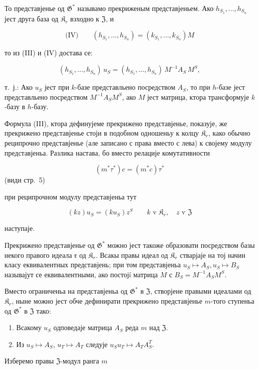 \documentclass[11pt]{article}
\begin{document}
То представјенье од \(\mathfrak{G}^*\) называмо прекриженым представјеньем. Ако \(h_{S_1}, \ldots, h_{S_n}\) јест друга база од \(\mathfrak{K}_r\) взходно к \(\mathfrak{Z}\), и

\[
\text{(IV)}\qquad (h_{S_1}, \ldots, h_{S_n}) = (k_{S_1}, \ldots, k_{S_n})M
\]

то из (III) и (IV) достава се:

\[(h_{S_1},\ldots,h_{S_n})\,u_S=(h_{S_1},\ldots,h_{S_n})\,M^{-1}A_S\,M^S,\]

т.~ј.: Ако \(u_S\) јест при \(k\)-базе представльено посредством \(A_S\), то при \(h\)-базе јест представльено посредством \(M^{-1}A_SM^S\), ако \(M\) јест матрица, ктора трансформује \(k\)-базу в \(h\)-базу.

Формула (III), ктора дефинујеме прекрижено представјенье, показује, же прекрижено представјенье стоји в подобном одношеньу к колцу \(\mathfrak K_r\), како обычно реципрочно представјенье (але записано с права вместо с лева) к својему модулу представјеньа. Разлика настава, бо вместо релације комутативности

\[(m^*\tau^*)c = (m^*c)\tau^*\]
(види стр.~5)

при реципрочном модулу представјеньа тут

\[
(kz)u_S=(ku_S)z^S\qquad k\text{ v }\mathfrak K_r,\quad z\text{ v }\mathfrak Z
\]

наступаје.

Прекрижено представјенье од \(\mathfrak{G}^*\) можно јест такоже образовати посредством базы некого правого идеала \(\mathfrak r\) од \(\mathfrak{K}_r\). Всакы правы идеал од \(\mathfrak{K}_r\) стварјаје на тој начин класу еквивалентных представјень; при том представјеньа \(u_S \mapsto A_S, u_S \mapsto B_S\) называјут се еквивалентными, ако постојí матрица \(M\) с \(B_S = M^{-1}A_SM^S\).

Вместо ограниченьа на представјеньа од \(\mathfrak G^*\) в \(\mathfrak Z\), створјене правыми идеалами од \(\mathfrak K_r\), ныне можно јест обче дефинирати прекрижено представјенье \(m\)-того ступеньа од \(\mathfrak G^*\) в \(\mathfrak Z\) тако:

\begin{enumerate}
\item Всакому \(u_S\) одповедаје матрица \(A_S\) реда \(m\) над \(\mathfrak Z\).
\item Из \(u_S \mapsto A_S\), \(u_T \mapsto A_T\) следује \(u_Su_T \mapsto A_TA_S^T\).
\end{enumerate}

Изберемо правы \(\mathfrak Z\)-модул ранга \(m\)
\end{document}
